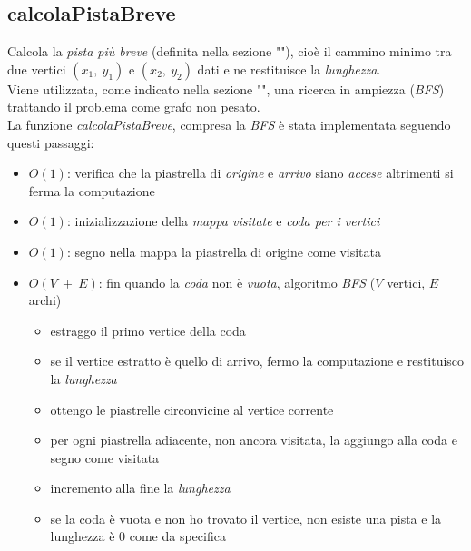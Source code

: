 \documentclass{article}
\begin{document}
\subsection{calcolaPistaBreve}\label{subsec:bfs}
Calcola la \textit{pista più breve} (definita nella sezione ""), cioè il cammino minimo tra due vertici \((x_1,\ y_1)\) e \((x_2,\ y_2)\) dati e ne restituisce la \textit{lunghezza}.\\
Viene utilizzata, come indicato nella sezione "", una ricerca in ampiezza (\textit{BFS}) trattando il problema come grafo non pesato.\\
La funzione \textit{calcolaPistaBreve}, compresa la \textit{BFS} è stata implementata seguendo questi passaggi:\\
\begin{itemize}
  \item \(O(1)\): verifica che la piastrella di \textit{origine} e \textit{arrivo} siano \textit{accese} altrimenti si ferma la computazione
  \item \(O(1)\): inizializzazione della \textit{mappa visitate} e \textit{coda per i vertici}
  \item \(O(1)\): segno nella mappa la piastrella di origine come visitata
  \item \(O(V\ +\ E)\): fin quando la \textit{coda} non è \textit{vuota}, algoritmo \textit{BFS} (\(V\) vertici, \(E\) archi)
  \begin{itemize}
    \item estraggo il primo vertice della coda
    \item se il vertice estratto è quello di arrivo, fermo la computazione e restituisco la \textit{lunghezza}
    \item ottengo le piastrelle circonvicine al vertice corrente
    \item per ogni piastrella adiacente, non ancora visitata, la aggiungo alla coda e segno come visitata
    \item incremento alla fine la \textit{lunghezza}
    \item se la coda è vuota e non ho trovato il vertice, non esiste una pista e la lunghezza è \(0\) come da specifica
  \end{itemize}
\end{itemize}
\end{document}
